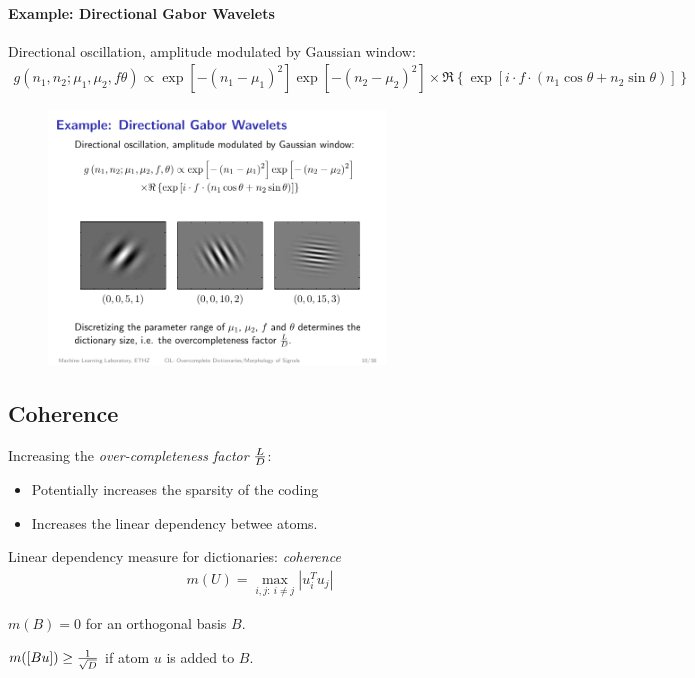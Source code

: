 \paragraph{Example: Directional Gabor Wavelets} Directional oscillation, amplitude modulated by Gaussian window:
\begin{align*}
    g(n_1, n_2; \mu_1, \mu_2,f\theta) \propto 
        \exp\left[ 
             -(n_1-\mu_1)^2
            \right]
        \exp\left[
                -(n_2-\mu_2)^2
            \right]
        \times \Re \left\{
                        \exp \left[
                                i\cdot f\cdot (n_1\cos\theta+n_2\sin\theta)
                            \right]
                    \right\}
\end{align*}
\begin{figure}[H]
    \centering
    \includegraphics[width=0.8\textwidth]{img/09_gabor}
\end{figure}

\subsection{Coherence}
Increasing the \emph{over-completeness factor} ${L\over D}$:
\begin{itemize}
    \item Potentially increases the sparsity of the coding
    \item Increases the linear dependency betwee atoms.
\end{itemize}

Linear dependency measure for dictionaries: \emph{coherence}
\begin{align*}
    m(U) = \max_{i,j:\ i\neq j} \left| u_i^T u_j \right|
\end{align*}
\begin{description}
    \item $m(B)=0$ for an orthogonal basis $B$.
    \item $m([Bu]) \geq {1\over \sqrt{D}} $ if atom $u$ is added to $B$.
\end{description}

